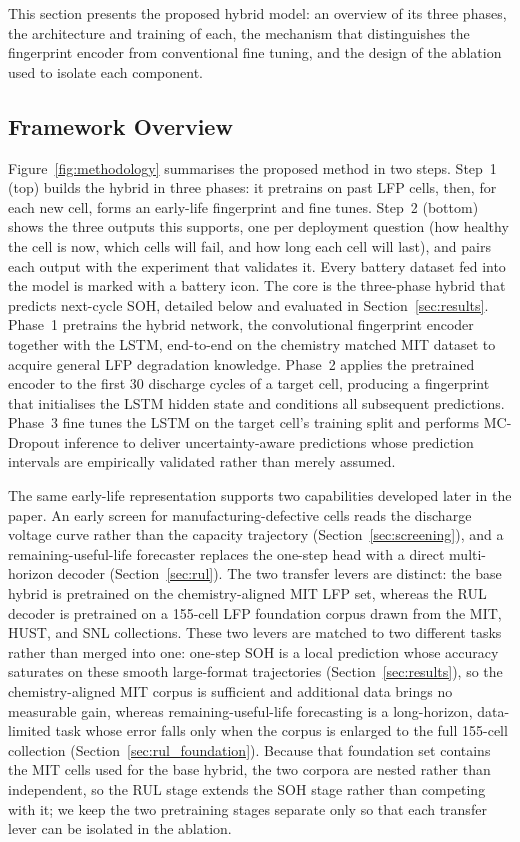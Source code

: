 This section presents the proposed hybrid model: an overview of its three phases,
the architecture and training of each, the mechanism that distinguishes the
fingerprint encoder from conventional fine tuning, and the design of the ablation
used to isolate each component.

\subsection{Framework Overview}\label{sec:framework}

Figure~\ref{fig:methodology} summarises the proposed method in two steps. Step~1
(top) builds the hybrid in three phases: it pretrains on past LFP cells, then, for
each new cell, forms an early-life fingerprint and fine tunes. Step~2 (bottom)
shows the three outputs this supports, one per deployment question (how healthy
the cell is now, which cells will fail, and how long each cell will last), and
pairs each output with the experiment that validates it. Every battery dataset fed
into the model is marked with a battery icon. The core is the three-phase hybrid
that predicts next-cycle SOH, detailed below and evaluated in
Section~\ref{sec:results}.
Phase~1 pretrains the hybrid network, the convolutional fingerprint encoder
together with the LSTM, end-to-end on the chemistry matched MIT dataset to
acquire general LFP degradation knowledge.
Phase~2 applies the pretrained encoder to the first 30 discharge cycles of a
target cell, producing a fingerprint that initialises the LSTM hidden state and
conditions all subsequent predictions.
Phase~3 fine tunes the LSTM on the target cell's training split and performs
MC-Dropout inference to deliver uncertainty-aware predictions whose
prediction intervals are empirically validated rather than merely assumed.

The same early-life representation supports two capabilities developed later in
the paper. An early screen for manufacturing-defective cells reads the discharge
voltage curve rather than the capacity trajectory (Section~\ref{sec:screening}),
and a remaining-useful-life forecaster replaces the one-step head with a direct
multi-horizon decoder (Section~\ref{sec:rul}). The two transfer levers are
distinct: the base hybrid is pretrained on the chemistry-aligned MIT LFP set,
whereas the RUL decoder is pretrained on a 155-cell LFP foundation corpus drawn
from the MIT, HUST, and SNL collections. These two levers are matched to two
different tasks rather than merged into one: one-step SOH is a local prediction
whose accuracy saturates on these smooth large-format trajectories
(Section~\ref{sec:results}), so the chemistry-aligned MIT corpus is sufficient
and additional data brings no measurable gain, whereas remaining-useful-life
forecasting is a long-horizon, data-limited task whose error falls only when the
corpus is enlarged to the full 155-cell collection
(Section~\ref{sec:rul_foundation}). Because that foundation set contains the MIT
cells used for the base hybrid, the two corpora are nested rather than
independent, so the RUL stage extends the SOH stage rather than competing with
it; we keep the two pretraining stages separate only so that each transfer lever
can be isolated in the ablation.

